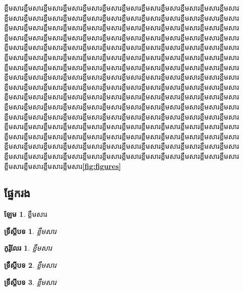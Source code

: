 \documentclass[a4paper,12pt,twoside]{book}
\newcommand{\KhOSML}{\fontspec[Script=Khmer]{Khmer OS Muol Light} \selectfont}
\theoremstyle{plain}
\newtheorem{theorem}{\KhOSML ទ្រឹស្ដីបទ}[chapter]
\newtheorem{corollary}{\KhOSML កូរ៉ូលែរ}[theorem]
\theoremstyle{definition}
\newtheorem{lemma}{\KhOSML ឡែម}[definition]%
\theoremstyle{remark}
\begin{document}
ខ្លឹមសារខ្លឹមសារខ្លឹមសារខ្លឹមសារខ្លឹមសារខ្លឹមសារខ្លឹមសារខ្លឹមសារខ្លឹមសារខ្លឹមសារខ្លឹមសារខ្លឹមសារខ្លឹមសារខ្លឹមសារខ្លឹមសារខ្លឹមសារខ្លឹមសារខ្លឹមសារខ្លឹមសារខ្លឹមសារខ្លឹមសារខ្លឹមសារខ្លឹមសារខ្លឹមសារខ្លឹមសារខ្លឹមសារខ្លឹមសារខ្លឹមសារខ្លឹមសារខ្លឹមសារខ្លឹមសារខ្លឹមសារខ្លឹមសារខ្លឹមសារខ្លឹមសារខ្លឹមសារខ្លឹមសារខ្លឹមសារខ្លឹមសារខ្លឹមសារខ្លឹមសារខ្លឹមសារខ្លឹមសារខ្លឹមសារខ្លឹមសារខ្លឹមសារខ្លឹមសារខ្លឹមសារខ្លឹមសារខ្លឹមសារខ្លឹមសារខ្លឹមសារខ្លឹមសារខ្លឹមសារខ្លឹមសារខ្លឹមសារខ្លឹមសារខ្លឹមសារខ្លឹមសារខ្លឹមសារខ្លឹមសារខ្លឹមសារខ្លឹមសារខ្លឹមសារខ្លឹមសារខ្លឹមសារខ្លឹមសារខ្លឹមសារខ្លឹមសារខ្លឹមសារខ្លឹមសារខ្លឹមសារខ្លឹមសារខ្លឹមសារខ្លឹមសារខ្លឹមសារខ្លឹមសារខ្លឹមសារខ្លឹមសារខ្លឹមសារខ្លឹមសារខ្លឹមសារខ្លឹមសារខ្លឹមសារខ្លឹមសារខ្លឹមសារខ្លឹមសារខ្លឹមសារខ្លឹមសារខ្លឹមសារខ្លឹមសារខ្លឹមសារខ្លឹមសារខ្លឹមសារខ្លឹមសារខ្លឹមសារខ្លឹមសារខ្លឹមសារខ្លឹមសារខ្លឹមសារខ្លឹមសារខ្លឹមសារខ្លឹមសារខ្លឹមសារខ្លឹមសារខ្លឹមសារខ្លឹមសារខ្លឹមសារខ្លឹមសារខ្លឹមសារខ្លឹមសារខ្លឹមសារខ្លឹមសារខ្លឹមសារខ្លឹមសារខ្លឹមសារខ្លឹមសារខ្លឹមសារខ្លឹមសារខ្លឹមសារខ្លឹមសារខ្លឹមសារខ្លឹមសារខ្លឹមសារខ្លឹមសារខ្លឹមសារខ្លឹមសារខ្លឹមសារខ្លឹមសារខ្លឹមសារខ្លឹមសារខ្លឹមសារខ្លឹមសារខ្លឹមសារខ្លឹមសារខ្លឹមសារខ្លឹមសារខ្លឹមសារខ្លឹមសារខ្លឹមសារខ្លឹមសារខ្លឹមសារខ្លឹមសារខ្លឹមសារខ្លឹមសារខ្លឹមសារខ្លឹមសារខ្លឹមសារខ្លឹមសារខ្លឹមសារខ្លឹមសារខ្លឹមសារខ្លឹមសារខ្លឹមសារខ្លឹមសារខ្លឹមសារខ្លឹមសារខ្លឹមសារខ្លឹមសារខ្លឹមសារខ្លឹមសារខ្លឹមសារខ្លឹមសារខ្លឹមសារខ្លឹមសារខ្លឹមសារខ្លឹមសារខ្លឹមសារខ្លឹមសារខ្លឹមសារខ្លឹមសារខ្លឹមសារខ្លឹមសារខ្លឹមសារខ្លឹមសារខ្លឹមសារខ្លឹមសារខ្លឹមសារខ្លឹមសារខ្លឹមសារខ្លឹមសារខ្លឹមសារខ្លឹមសារខ្លឹមសារខ្លឹមសារខ្លឹមសារខ្លឹមសារខ្លឹមសារខ្លឹមសារខ្លឹមសារខ្លឹមសារខ្លឹមសារខ្លឹមសារខ្លឹមសារខ្លឹមសារខ្លឹមសារ{\textbf{\cref*{fig:figures}}}
  

\subsection{ផ្នែករង}

\begin{lemma}
ខ្លឹមសារ
\end{lemma}

\begin{theorem}
ខ្លឹមសារ
\end{theorem}

\begin{corollary}
ខ្លឹមសារ
\end{corollary}

\begin{theorem}
ខ្លឹមសារ
\end{theorem}

\begin{theorem}
ខ្លឹមសារ
\end{theorem}
\end{document}
